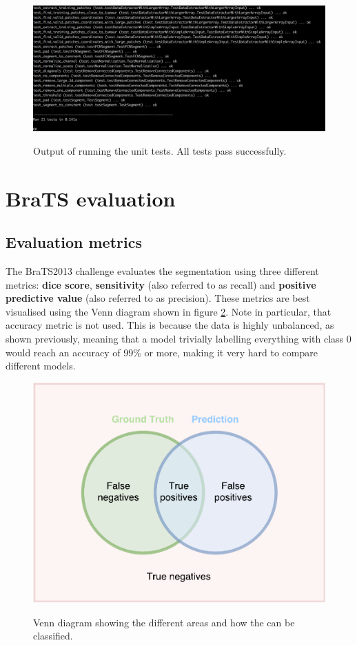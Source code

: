 \documentclass[12pt,a4paper,twoside,openright]{report}
\begin{document}
\begin{figure}
	\centering
	\includegraphics[width = \textwidth]{unit_test_output}
	\label{fig:unit_test_output}
	\caption{Output of running the unit tests. All tests pass successfully.}
\end{figure}

\section{BraTS evaluation}
\subsection{Evaluation metrics}
The BraTS2013 challenge \cite{brats-proceedings} evaluates the segmentation using three different metrics: \textbf{dice score}, \textbf{sensitivity} (also referred to as recall) and \textbf{positive predictive value} (also referred to as precision). These metrics are best visualised using the Venn diagram shown in figure \ref{fig:evaluation_venn_diagram}.  Note in particular, that accuracy metric is not used. This is because the data is highly unbalanced, as shown previously, meaning that a model trivially labelling everything with class 0 would reach an accuracy of 99\% or more, making it very hard to compare different models.

\begin{figure}
	\centering
	\includegraphics[scale = 0.5]{evaluation_venn_diagram}
	\label{fig:evaluation_venn_diagram}
	\caption{Venn diagram showing the different areas and how the can be classified.}
\end{figure}
\end{document}
